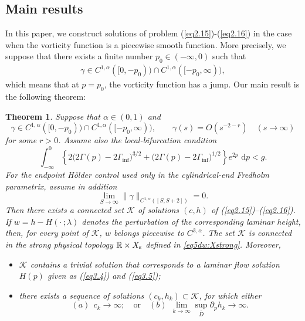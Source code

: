 \documentclass[11pt,reqno]{amsart}
\numberwithin{equation}{section}
\newtheorem{theorem}{Theorem}[section]
\newcommand{\dd}{\,\mathrm{d}}
\theoremstyle{definition}
\theoremstyle{remark}
\begin{document}
\subsection{Main results}
In this paper, we construct solutions of problem
(\ref{eq2.15})-(\ref{eq2.16}) in the case when the vorticity
function is a piecewise smooth function. More precisely, we suppose
that there exists a finite number $p_0\in (-\infty, 0)$ such that
\begin{eqnarray} \label{eq2.17}
\gamma \in C^{1,\alpha}([0,-p_0))\cap C^{1,\alpha}([-p_0, \infty)),
\end{eqnarray}
which means that at $p=p_0$, the vorticity function has a jump. Our
main result is the following theorem:

\begin{theorem}\label{thm2.1}
Suppose that $\alpha\in(0,1)$ and
\[
 \gamma\in C^{1,\alpha}([0,-p_0))
 \cap C^{1,\alpha}([-p_0,\infty)),
 \qquad
 \gamma(s)=O(s^{-2-r})\quad(s\to\infty)
\]
for some $r>0$. Assume also the local-bifurcation condition
\begin{equation}\label{eq2.bifcondition}
\int_{-\infty}^{0}
\left\{
2\bigl(2\Gamma(p)-2\Gamma_{\inf}\bigr)^{3/2}
+
\bigl(2\Gamma(p)-2\Gamma_{\inf}\bigr)^{1/2}
\right\}e^{2p}\,\dd p<g.
\end{equation}
For the endpoint H\"older control used only in the cylindrical-end
Fredholm parametrix, assume in addition
\begin{equation}\label{eq2.asymptotic-holder}
 \lim_{S\to\infty}
 \|\gamma\|_{C^{1,\alpha}([S,S+2])}=0.
\end{equation}
Then there exists a connected set
$\mathcal{K}$ of solutions $(c,h)$ of
(\ref{eq2.15})--(\ref{eq2.16}).  If
$w=h-H(\cdot\,;\lambda)$ denotes the perturbation of the
corresponding laminar height, then, for every point of
$\mathcal K$, $w$ belongs piecewise to $C^{3,\alpha}$.  The set $\mathcal K$ is connected in the
strong physical topology $\mathbb R\times X_{\rm s}$ defined in
\eqref{eq5dw:Xstrong}.  Moreover,

\begin{itemize}
  \item [(1)] $\mathcal{K}$ contains a trivial solution that corresponds to a
laminar flow solution $H(p)$ given as (\ref{eq3.4}) and
(\ref{eq3.5});
  \item [(2)] there exists a sequence of solutions $(c_k, h_k)\subset\mathcal{K}$,
for which either
\begin{equation*}
(a)~~ c_k\rightarrow \infty;\quad
\text{or}\quad (b)~~ \lim_{k\rightarrow
\infty}\sup_{\overline{D}}\partial_p h_k\rightarrow \infty.
\end{equation*}
\end{itemize}
\end{theorem}
\end{document}
